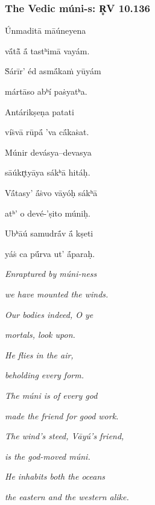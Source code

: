 \documentclass[pdf]{beamer}
\begin{document}
\begin{frame} \frametitle{The Vedic múni-s: R̥V 10.136}
\begin{center}
\begin{multicols}{2}
\scriptsize{
	Únmaditā māúneyena

	vā́tā̃ ā́ tastʰimā vayám.

	Ṡárīr' éd asmā́kaṁ yūyám

	mártāso abʰí paṡyatʰa.

	\vspace{\baselineskip}

	Antárikṣeṇa patati

	víṡvā rūpā́ 'va cā́kaṡat.

	Múnir devásya--devasya

	sāúkr̥tyāya sákʰā hitáḥ.

	\vspace{\baselineskip}

	Vā́tasy' ā́ṡvo vāyóḥ sákʰā

	atʰ' o devé-'ṣito múniḥ.

	Ubʰāú samudrā́v ā́ kṣeti

	yáṡ ca pū́rva ut' ā́paraḥ.

	\columnbreak

	\textit{Enraptured by múni-ness}

	\textit{we have mounted the winds.}

	\textit{Our bodies indeed, O ye}

	\textit{mortals, look upon.}

	\vspace{\baselineskip}

	\textit{He flies in the air,}

	\textit{beholding every form.}

	\textit{The múni is of every god}

	\textit{made the friend for good work.}

	\vspace{\baselineskip}

	\textit{The wind's steed, Vāyú's friend,}

	\textit{is the god-moved múni.}

	\textit{He inhabits both the oceans}

	\textit{the eastern and the western alike.}
}
\end{multicols}
\end{center}
\end{frame}
\end{document}
